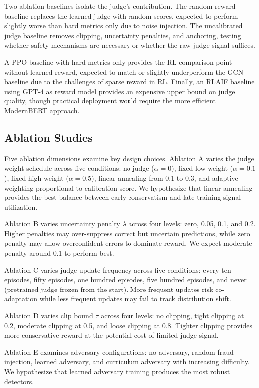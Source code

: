\documentclass[11pt,a4paper]{article}
\begin{document}
Two ablation baselines isolate the judge's contribution. The random reward baseline replaces the learned judge with random scores, expected to perform slightly worse than hard metrics only due to noise injection. The uncalibrated judge baseline removes clipping, uncertainty penalties, and anchoring, testing whether safety mechanisms are necessary or whether the raw judge signal suffices.

A PPO baseline with hard metrics only provides the RL comparison point without learned reward, expected to match or slightly underperform the GCN baseline due to the challenges of sparse reward in RL. Finally, an RLAIF baseline using GPT-4 as reward model provides an expensive upper bound on judge quality, though practical deployment would require the more efficient ModernBERT approach.

\subsection{Ablation Studies}

Five ablation dimensions examine key design choices. Ablation A varies the judge weight schedule across five conditions: no judge ($\alpha = 0$), fixed low weight ($\alpha = 0.1$), fixed high weight ($\alpha = 0.5$), linear annealing from 0.1 to 0.3, and adaptive weighting proportional to calibration score. We hypothesize that linear annealing provides the best balance between early conservatism and late-training signal utilization.

Ablation B varies uncertainty penalty $\lambda$ across four levels: zero, 0.05, 0.1, and 0.2. Higher penalties may over-suppress correct but uncertain predictions, while zero penalty may allow overconfident errors to dominate reward. We expect moderate penalty around 0.1 to perform best.

Ablation C varies judge update frequency across five conditions: every ten episodes, fifty episodes, one hundred episodes, five hundred episodes, and never (pretrained judge frozen from the start). More frequent updates risk co-adaptation while less frequent updates may fail to track distribution shift.

Ablation D varies clip bound $\tau$ across four levels: no clipping, tight clipping at 0.2, moderate clipping at 0.5, and loose clipping at 0.8. Tighter clipping provides more conservative reward at the potential cost of limited judge signal.

Ablation E examines adversary configurations: no adversary, random fraud injection, learned adversary, and curriculum adversary with increasing difficulty. We hypothesize that learned adversary training produces the most robust detectors.
\end{document}

